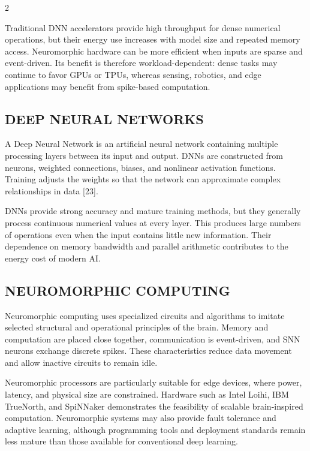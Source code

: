 \begin{multicols}{2}
  {\justifying\noindent
  Traditional DNN accelerators provide high throughput for dense numerical operations, but their energy use increases with model size and repeated memory access. Neuromorphic hardware can be more efficient when inputs are sparse and event-driven. Its benefit is therefore workload-dependent: dense tasks may continue to favor GPUs or TPUs, whereas sensing, robotics, and edge applications may benefit from spike-based computation.\par}

  \subsection*{\centering\uppercase{Deep Neural Networks}}
  A Deep Neural Network is an artificial neural network containing multiple processing layers between its input and output. DNNs are constructed from neurons, weighted connections, biases, and nonlinear activation functions. Training adjusts the weights so that the network can approximate complex relationships in data [23].

  \noindent
  DNNs provide strong accuracy and mature training methods, but they generally process continuous numerical values at every layer. This produces large numbers of operations even when the input contains little new information. Their dependence on memory bandwidth and parallel arithmetic contributes to the energy cost of modern AI.

  \subsection*{\centering\uppercase{Neuromorphic Computing}}
  Neuromorphic computing uses specialized circuits and algorithms to imitate selected structural and operational principles of the brain. Memory and computation are placed close together, communication is event-driven, and SNN neurons exchange discrete spikes. These characteristics reduce data movement and allow inactive circuits to remain idle.

  \noindent
  Neuromorphic processors are particularly suitable for edge devices, where power, latency, and physical size are constrained. Hardware such as Intel Loihi, IBM TrueNorth, and SpiNNaker demonstrates the feasibility of scalable brain-inspired computation. Neuromorphic systems may also provide fault tolerance and adaptive learning, although programming tools and deployment standards remain less mature than those available for conventional deep learning.


\end{multicols}
